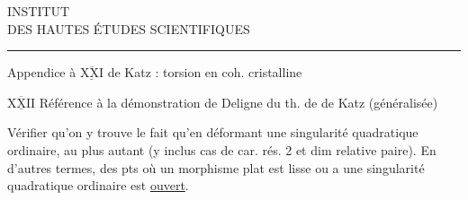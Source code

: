 \begin{center}
INSTITUT\\
DES HAUTES ÉTUDES SCIENTIFIQUES\\[-.3ex]
\rule{1.3cm}{.4pt}
\end{center}

Appendice à $\underline{\overline{\mathrm{XXI}}}$ de Katz : torsion en coh. cristalline

$\underline{\overline{\mathrm{XXII}}}$ \quad Référence à la démonstration de Deligne du th. de  de Katz (généralisée)

{\reversemarginpar{}}Vérifier qu'on y trouve le fait qu'en déformant une singularité quadratique ordinaire,  au plus autant (y inclus cas de car. rés. 2 et dim relative paire). En d'autres termes,  des pts où un morphisme plat   est lisse ou a une singularité quadratique ordinaire est  \uline{ouvert}.

